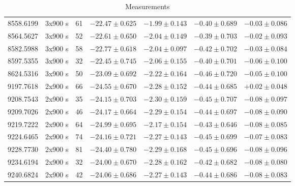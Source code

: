 \documentclass[]{aastex631}
\begin{document}
\begin{table*}
\begin{tabular}{lcccccc}
         8558.6199 & 3x900 s& 61 & $-22.47 \pm 0.625$ & $-1.99 \pm 0.143$ & $-0.40 \pm 0.689$ & $-0.03 \pm 0.086$ \\ 
         
         8564.5627 & 3x900 s& 52  & $-22.61 \pm 0.650$ & $-2.04 \pm 0.149$ & $-0.39 \pm 0.703$ & $-0.02 \pm 0.093$	 \\ 
         
         8582.5988 & 3x900 s& 58  & $-22.77 \pm 0.618$ & $-2.04 \pm 0.097$ & $-0.42 \pm 0.702$ & $-0.03 \pm 0.084$ \\ 
         
         8597.5355 & 3x900 s& 32 & $-22.45 \pm 0.745$ & $-2.06 \pm 0.155$ & $-0.40 \pm 0.701$ & $-0.06 \pm 0.100$ \\ 
         
         8624.5316 & 3x900 s& 50 & $-23.09 \pm 0.692$ & $-2.22 \pm 0.164$ & $-0.46 \pm 0.720$ & $-0.05 \pm 0.100$ \\ 
         
        9197.7618 & 2x900 s& 66  & $-24.55 \pm 0.670$ & $-2.28 \pm 0.152$ & $-0.44 \pm 0.685$ & $+0.02 \pm0.048$\\
        
        9208.7543 & 2x900 s& 35 & $-24.15 \pm 0.703$ & $-2.30 \pm 0.159$ & $-0.45 \pm 0.707$ & $-0.08 \pm 0.097$\\
        
        9209.7026 & 2x900 s& 46  & $-24.17 \pm 0.664$ & $-2.29 \pm 0.154$ & $-0.44 \pm 0.697$ & $-0.08 \pm 0.090$\\
        
        9219.7222 & 2x900 s& 64  & $-24.99 \pm 0.695$ & $-2.17 \pm 0.154$ & $-0.43 \pm 0.646$ & $-0.08 \pm 0.085$\\
        
        9224.6465 & 2x900 s& 74  & $-24.16 \pm 0.721$ & $-2.27 \pm 0.143$ & $-0.45 \pm 0.699$ & $-0.07 \pm 0.083$\\
        
        9228.7730 & 2x900 s& 81  & $-24.40 \pm 0.780$ & $-2.29 \pm 0.168$ & $-0.45 \pm 0.696$ & $-0.08 \pm 0.096 $ \\
        
        9234.6194 & 2x900 s& 32  & $-24.00 \pm 0.670$ & $-2.28 \pm 0.162$ & $-0.42 \pm 0.682$ & $-0.08 \pm 0.080$ \\
        
        9240.6824 & 2x900 s& 42  & $-24.06 \pm 0.686$ & $-2.27 \pm 0.143$ & $-0.44 \pm 0.686$ & $-0.08 \pm 0.083$\\
        
\hline
    \end{tabular}
    \caption{Measurements}
    \label{measurements}
\end{table*}
\end{document}
